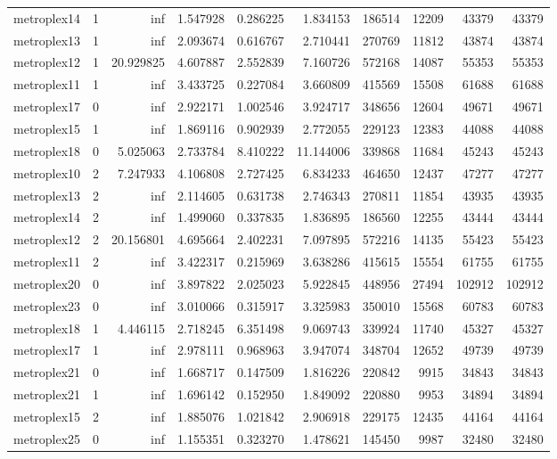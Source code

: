 \begin{longtable}{|l|r|r|r|r|r|r|r|r|r|}
metroplex14 & 1 & inf & 1.547928 & 0.286225 & 1.834153 & 186514 & 12209 & 43379 & 43379 \\
metroplex13 & 1 & inf & 2.093674 & 0.616767 & 2.710441 & 270769 & 11812 & 43874 & 43874 \\
metroplex12 & 1 & 20.929825 & 4.607887 & 2.552839 & 7.160726 & 572168 & 14087 & 55353 & 55353 \\
metroplex11 & 1 & inf & 3.433725 & 0.227084 & 3.660809 & 415569 & 15508 & 61688 & 61688 \\
metroplex17 & 0 & inf & 2.922171 & 1.002546 & 3.924717 & 348656 & 12604 & 49671 & 49671 \\
metroplex15 & 1 & inf & 1.869116 & 0.902939 & 2.772055 & 229123 & 12383 & 44088 & 44088 \\
metroplex18 & 0 & 5.025063 & 2.733784 & 8.410222 & 11.144006 & 339868 & 11684 & 45243 & 45243 \\
metroplex10 & 2 & 7.247933 & 4.106808 & 2.727425 & 6.834233 & 464650 & 12437 & 47277 & 47277 \\
metroplex13 & 2 & inf & 2.114605 & 0.631738 & 2.746343 & 270811 & 11854 & 43935 & 43935 \\
metroplex14 & 2 & inf & 1.499060 & 0.337835 & 1.836895 & 186560 & 12255 & 43444 & 43444 \\
metroplex12 & 2 & 20.156801 & 4.695664 & 2.402231 & 7.097895 & 572216 & 14135 & 55423 & 55423 \\
metroplex11 & 2 & inf & 3.422317 & 0.215969 & 3.638286 & 415615 & 15554 & 61755 & 61755 \\
metroplex20 & 0 & inf & 3.897822 & 2.025023 & 5.922845 & 448956 & 27494 & 102912 & 102912 \\
metroplex23 & 0 & inf & 3.010066 & 0.315917 & 3.325983 & 350010 & 15568 & 60783 & 60783 \\
metroplex18 & 1 & 4.446115 & 2.718245 & 6.351498 & 9.069743 & 339924 & 11740 & 45327 & 45327 \\
metroplex17 & 1 & inf & 2.978111 & 0.968963 & 3.947074 & 348704 & 12652 & 49739 & 49739 \\
metroplex21 & 0 & inf & 1.668717 & 0.147509 & 1.816226 & 220842 & 9915 & 34843 & 34843 \\
metroplex21 & 1 & inf & 1.696142 & 0.152950 & 1.849092 & 220880 & 9953 & 34894 & 34894 \\
metroplex15 & 2 & inf & 1.885076 & 1.021842 & 2.906918 & 229175 & 12435 & 44164 & 44164 \\
metroplex25 & 0 & inf & 1.155351 & 0.323270 & 1.478621 & 145450 & 9987 & 32480 & 32480 \\

\end{longtable}
